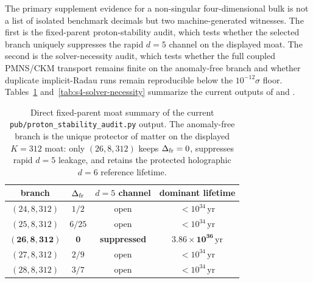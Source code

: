 \documentclass[11pt]{article}
\begin{document}
The primary supplement evidence for a non-singular four-dimensional bulk is not a list of isolated benchmark decimals but two machine-generated witnesses. The first is the fixed-parent proton-stability audit, which tests whether the selected branch uniquely suppresses the rapid $d=5$ channel on the displayed moat. The second is the solver-necessity audit, which tests whether the full coupled PMNS/CKM transport remains finite on the anomaly-free branch and whether duplicate implicit-Radau runs remain reproducible below the $10^{-12}\sigma$ floor. Tables~\ref{tab:s4-proton-stability-audit} and~\ref{tab:s4-solver-necessity} summarize the current outputs of  and .

\begin{table}[t]
\centering
{\scriptsize
\setlength{\tabcolsep}{4pt}
\renewcommand{\arraystretch}{1.03}
\begin{tabular}{|c|c|c|c|}
\hline
branch & $\Delta_{\rm fr}$ & $d=5$ channel & dominant lifetime \\
\hline
$(24,8,312)$ & $1/2$ & open & $<10^{34}\,\mathrm{yr}$ \\
$(25,8,312)$ & $6/25$ & open & $<10^{34}\,\mathrm{yr}$ \\
$\mathbf{(26,8,312)}$ & $\mathbf{0}$ & \textbf{suppressed} & $\mathbf{3.86\times10^{36}\,\mathrm{yr}}$ \\
$(27,8,312)$ & $2/9$ & open & $<10^{34}\,\mathrm{yr}$ \\
$(28,8,312)$ & $3/7$ & open & $<10^{34}\,\mathrm{yr}$ \\
\hline
\end{tabular}}
\caption{Direct fixed-parent moat summary of the current \texttt{pub/proton\_stability\_audit.py} output. The anomaly-free branch is the unique protector of matter on the displayed $K=312$ moat: only $(26,8,312)$ keeps $\Delta_{\rm fr}=0$, suppresses rapid $d=5$ leakage, and retains the protected holographic $d=6$ reference lifetime.}
\label{tab:s4-proton-stability-audit}
\end{table}
\end{document}
